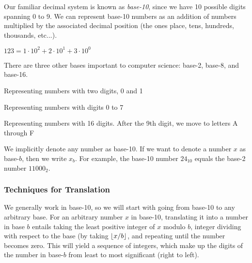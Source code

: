 \documentclass[main.tex]{subfiles}
\begin{document}
Our familiar decimal system is known as \textit{base-10}, since we have 10 possible digits spanning 0 to 9. We can represent base-10 numbers as an addition of numbers multiplied by the associated decimal position (the ones place, tens, hundreds, thousands, etc...).

\begin{example}
	\(123 = 1 \cdot 10^2 + 2 \cdot 10^1 + 3 \cdot 10^0\)
\end{example}

There are three other bases important to computer science: base-2, base-8, and base-16.

\begin{defn}
	Representing numbers with two digits, 0 and 1
\end{defn}

\begin{defn}
	Representing numbers with digits 0 to 7
\end{defn}

\begin{defn}
	Representing numbers with 16 digits. After the 9th digit, we move to letters A through F
\end{defn}

We implicitly denote any number as base-10. If we want to denote a number \(x\) as base-\(b\), then we write \(x_b\). For example, the base-10 number \(24_{10}\) equals the base-2 number \(11000_2\).

\subsubsection{Techniques for Translation}

We generally work in base-10, so we will start with going from base-10 to any arbitrary base. For an arbitrary number \(x\) in base-10, translating it into a number in base \(b\) entails taking the least positive integer of \(x\) modulo \(b\), integer dividing with respect to the base (by taking \(\lfloor x/b\rfloor\), and repeating until the number becomes zero. This will yield a sequence of integers, which make up the digits of the number in base-\(b\) from least to most significant (right to left).

\end{document}
